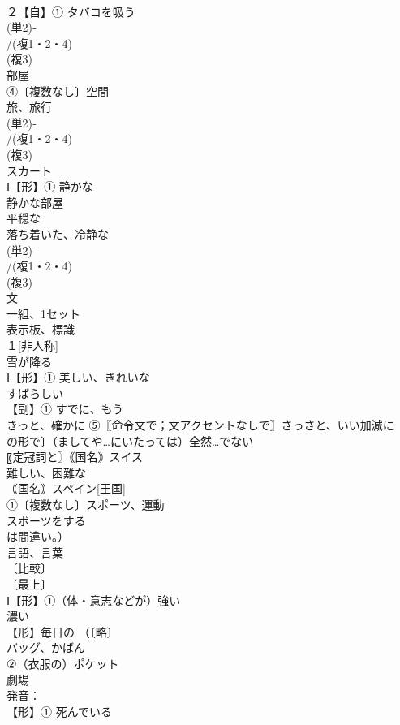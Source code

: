 \documentclass[8pt]{extreport}
\begin{document}
\begin{CJK}{UTF8}{min}
\\	２【自】① タバコを吸う
\\	(単2)‐
\\	/(複1・2・4)
\\	(複3)
\\	部屋 
\\	④〔複数なし〕空間
\\	旅、旅行 
\\	(単2)‐
\\	/(複1・2・4)
\\	(複3)
\\	スカート 
\\	Ⅰ【形】① 静かな 
\\	静かな部屋 
\\	平穏な　
\\	落ち着いた、冷静な
\\	(単2)‐
\\	/(複1・2・4)
\\	(複3)
\\	文 
\\	一組、1セット
\\	表示板、標識
\\	１[非人称] 
\\	雪が降る 
\\	Ⅰ【形】① 美しい、きれいな 
\\	すばらしい
\\	【副】① すでに、もう 
\\	きっと、確かに ⑤〖命令文で；文アクセントなしで〗さっさと、いい加減に 
\\	の形で〕（ましてや…にいたっては）全然…でない
\\	〖定冠詞と〗｟国名｠スイス
\\	難しい、困難な 
\\	｟国名｠スペイン[王国]
\\	①〔複数なし〕スポーツ、運動 
\\	スポーツをする
\\	は間違い。） 
\\	言語、言葉 
\\	〔比較〕
\\	〔最上〕
\\	Ⅰ【形】①（体・意志などが）強い 
\\	濃い
\\	【形】毎日の （〔略〕
\\	バッグ、かばん 
\\	②（衣服の）ポケット
\\	劇場 
\\	発音：
\\	【形】① 死んでいる 

\end{CJK}
\end{document}
